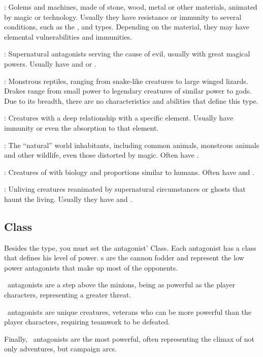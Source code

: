 \begin{multicols}{2}
\tmtypeconstr{}: Golems and machines, made of stone, wood, metal or other materials, animated by magic or technology. Usually they have resistance or immunity to several conditions, such as the ,  and  types. Depending on the material, they may have elemental vulnerabilities and immunities.

\tmtypedemon{}: Supernatural antagonists serving the cause of evil, usually with great magical powers. Usually have  and  or .

\tmtypedrgn{}: Monstrous reptiles, ranging from snake-like creatures to large winged lizards. Drakes range from small power to legendary creatures of similar power to gods. Due to its breadth, there are no characteristics and abilities that define this type.

\tmtypeelem{}: Creatures with a deep relationship with a specific element. Usually have immunity or even the absorption to that element.

\tmtypebeast{}: The ``natural'' world inhabitants, including common animals, monstrous animals and other wildlife, even those distorted by magic. Often have .

\tmtypehuman{}: Creatures of with biology and proportions similar to humans. Often have  and .

\tmtypeundead{}: Unliving creatures reanimated by supernatural circumstances or ghosts that haunt the living. Usually they have  and .

\subsection{Class}\label{subsec:gm-class}
Besides the type, you must set the antagonist’ Class. Each antagonist has a class that defines his level of power. \tmobmini{}s are the cannon fodder and represent the low power antagonists that make up most of the opponents.

\tmobcomm{}\ antagonists are a step above the minions, being as powerful as the player characters, representing a greater threat.

\tmobleet{}\ antagonists are unique creatures, veterans who can be more powerful than the player characters, requiring teamwork to be defeated.

Finally, \tmobboss{}\ antagonists are the most powerful, often representing the climax of not only adventures, but campaign arcs.


\end{multicols}
